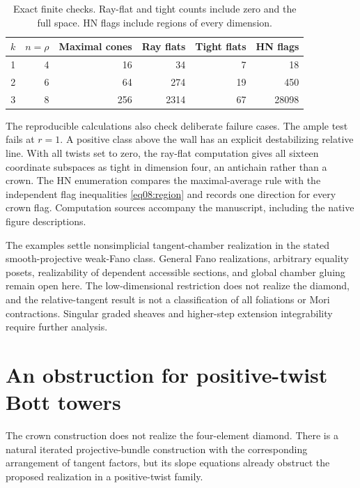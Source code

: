 \documentclass[11pt]{amsart}
\theoremstyle{definition}
\theoremstyle{remark}
\begin{document}
\begin{table}[htbp]
\centering
\caption{Exact finite checks. Ray-flat and tight counts include zero
and the full space. HN flags include regions of every dimension.}
\label{tab09:checks}
\begin{tabular}{@{}rrrrrr@{}}
\toprule
\(k\)&\(n=\rho\)&Maximal cones&Ray flats&Tight flats&HN flags\\
\midrule
1&4&16&34&7&18\\
2&6&64&274&19&450\\
3&8&256&2314&67&28098\\
\bottomrule
\end{tabular}
\end{table}

The reproducible calculations also check deliberate failure cases.
The ample test fails at \(r=1\). A positive class above the wall
has an explicit destabilizing relative line. With all twists set
to zero, the ray-flat computation gives all sixteen coordinate
subspaces as tight in dimension four, an antichain rather than a
crown. The HN enumeration compares the maximal-average rule with
the independent flag inequalities \eqref{eq08:region} and records
one direction for every crown flag. Computation sources accompany
the manuscript, including the native figure descriptions.

The examples settle nonsimplicial tangent-chamber realization in
the stated smooth-projective weak-Fano class. General Fano
realizations, arbitrary equality posets, realizability of dependent
accessible sections, and global chamber gluing remain open here.
The low-dimensional restriction does not realize the diamond, and
the relative-tangent result is not a classification of all
foliations or Mori contractions. Singular graded sheaves and
higher-step extension integrability require further analysis.

\section{An obstruction for positive-twist Bott towers}
\label{sec10:obstruction}

The crown construction does not realize the four-element diamond.
There is a natural iterated projective-bundle construction with the
corresponding arrangement of tangent factors, but its slope equations
already obstruct the proposed realization in a positive-twist family.
\end{document}
